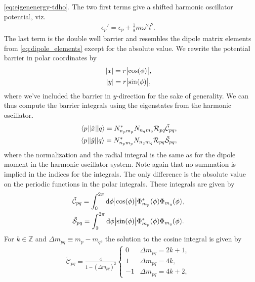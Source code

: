         \autoref{eq:eigenenergy-tdho}.
        The two first terms give a shifted harmonic oscillator potential, viz.
        \begin{align}
            \epsilon_p' = \epsilon_p + \frac{1}{8} m \omega^2 l^2.
        \end{align}
        The last term is the double well barrier and resembles the dipole matrix
        elements from \autoref{eq:dipole_elements} except for the absolute
        value.
        We rewrite the potential barrier in polar coordinates by
        \begin{gather}
            \abs{x} = r\abs{\cos(\phi)}, \\
            \abs{y} = r\abs{\sin(\phi)},
        \end{gather}
        where we've included the barrier in $y$-direction for the sake of
        generality.
        We can thus compute the barrier integrals using the eigenstates from the
        harmonic oscillator.
        \begin{gather}
            \mel{p}{\abs{\position}}{q}
            =
            N^{*}_{n_p m_p} N_{n_q m_q}
            \mathcal{R}_{pq} \tilde{\mathcal{C}}_{pq},
            \\
            \mel{p}{\abs{\position[y]}}{q}
            =
            N^{*}_{n_p m_p} N_{n_q m_q}
            \mathcal{R}_{pq} \tilde{\mathcal{S}}_{pq},
        \end{gather}
        where the normalization and the radial integral is the same as for the
        dipole moment in the harmonic oscillator system.
        Note again that no summation is implied in the indices for the
        integrals.
        The only difference is the absolute value on the periodic functions in
        the polar integrals.
        These integrals are given by
        \begin{gather}
            \tilde{\mathcal{C}}_{pq}
            =
            \int_{0}^{2\pi} \dd \phi
            \abs{\cos(\phi)}
            \Phi^{*}_{m_p}(\phi)
            \Phi_{m_q}(\phi),
            \\
            \tilde{\mathcal{S}}_{pq}
            =
            \int_{0}^{2\pi} \dd \phi
            \abs{\sin(\phi)}
            \Phi^{*}_{m_p}(\phi)
            \Phi_{m_q}(\phi).
        \end{gather}
        For $k \in \mathbb{Z}$ and $\Delta m_{pq} \equiv m_p - m_q$, the
        solution to the cosine integral is given by
        \begin{align}
            \tilde{\mathcal{C}}_{pq}
            =
            \frac{4}{1 - (\Delta m_{pq})^2}
            \begin{cases}
                0 & \Delta m_{pq} = 2k + 1, \\
                1 & \Delta m_{pq} = 4k, \\
                -1 & \Delta m_{pq} = 4k + 2,
            \end{cases}
        \end{align}
